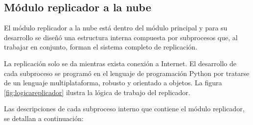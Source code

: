 \subsection{Módulo replicador a la nube}

El módulo replicador a la nube está dentro del módulo principal y para su desarrollo se diseñó una estructura interna compuesta por subprocesos que, al trabajar en conjunto, forman el sistema completo de replicación.

La replicación solo se da mientras exista conexión a Internet. El desarrollo de cada subproceso se programó en el lenguaje de programación Python por tratarse de un lenguaje multiplataforma, robusto y orientado a objetos. La figura \ref{fig:logicareplicador} ilustra la lógica de trabajo del replicador.





Las descripciones de cada subproceso interno que contiene el módulo replicador, se detallan a continuación: 

